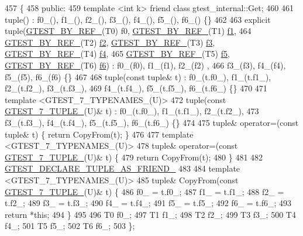 \begin{DoxyCode}
457                         \{
458  \textcolor{keyword}{public}:
459   \textcolor{keyword}{template} <\textcolor{keywordtype}{int} k> \textcolor{keyword}{friend} \textcolor{keyword}{class }gtest\_internal::Get;
460 
461   tuple() : f0\_(), f1\_(), f2\_(), f3\_(), f4\_(), f5\_(), f6\_() \{\}
462 
463   \textcolor{keyword}{explicit} tuple(\hyperlink{gtest-tuple_8h_adcf9057737a411d833fac0382c13a181}{GTEST\_BY\_REF\_}(T0) f0, \hyperlink{gtest-tuple_8h_adcf9057737a411d833fac0382c13a181}{GTEST\_BY\_REF\_}(T1) 
      \hyperlink{namespacestd_1_1tr1_a9c0fa65b105f8e2f58ba59ecf75fd000}{f1},
464       \hyperlink{gtest-tuple_8h_adcf9057737a411d833fac0382c13a181}{GTEST\_BY\_REF\_}(T2) \hyperlink{namespacestd_1_1tr1_a87dd9e009868361317f587126dba63d4}{f2}, \hyperlink{gtest-tuple_8h_adcf9057737a411d833fac0382c13a181}{GTEST\_BY\_REF\_}(T3) \hyperlink{namespacestd_1_1tr1_a0f7c3b47d27d42d82d1a333ea420ce4e}{f3}, 
      \hyperlink{gtest-tuple_8h_adcf9057737a411d833fac0382c13a181}{GTEST\_BY\_REF\_}(T4) \hyperlink{namespacestd_1_1tr1_adc796e02b7385d526aff708189564f67}{f4},
465       \hyperlink{gtest-tuple_8h_adcf9057737a411d833fac0382c13a181}{GTEST\_BY\_REF\_}(T5) \hyperlink{namespacestd_1_1tr1_a9c1eb66b2b2fa321942af95405232a0d}{f5}, \hyperlink{gtest-tuple_8h_adcf9057737a411d833fac0382c13a181}{GTEST\_BY\_REF\_}(T6) \hyperlink{namespacestd_1_1tr1_a6b62f32e1e3e21bceb94eb46c4cbfd56}{f6}) : f0\_(f0), f1\_(f1), f2\_(f2)
      ,
466       f3\_(f3), f4\_(f4), f5\_(f5), f6\_(f6) \{\}
467 
468   tuple(\textcolor{keyword}{const} tuple& t) : f0\_(t.f0\_), f1\_(t.f1\_), f2\_(t.f2\_), f3\_(t.f3\_),
469       f4\_(t.f4\_), f5\_(t.f5\_), f6\_(t.f6\_) \{\}
470 
471   \textcolor{keyword}{template} <GTEST\_7\_TYPENAMES\_(U)>
472   tuple(\textcolor{keyword}{const} \hyperlink{gtest-tuple_8h_a8987baf82ee028d1d778447413a02c0c}{GTEST\_7\_TUPLE\_}(U)& t) : f0\_(t.f0\_), f1\_(t.f1\_), f2\_(t.f2\_),
473       f3\_(t.f3\_), f4\_(t.f4\_), f5\_(t.f5\_), f6\_(t.f6\_) \{\}
474 
475   tuple& operator=(\textcolor{keyword}{const} tuple& t) \{ \textcolor{keywordflow}{return} CopyFrom(t); \}
476 
477   \textcolor{keyword}{template} <GTEST\_7\_TYPENAMES\_(U)>
478   tuple& operator=(\textcolor{keyword}{const} \hyperlink{gtest-tuple_8h_a8987baf82ee028d1d778447413a02c0c}{GTEST\_7\_TUPLE\_}(U)& t) \{
479     \textcolor{keywordflow}{return} CopyFrom(t);
480   \}
481 
482   \hyperlink{gtest-tuple_8h_a2b20671273f514a88a6e9b8328e5f257}{GTEST\_DECLARE\_TUPLE\_AS\_FRIEND\_}
483 
484   \textcolor{keyword}{template} <GTEST\_7\_TYPENAMES\_(U)>
485   tuple& CopyFrom(\textcolor{keyword}{const} \hyperlink{gtest-tuple_8h_a8987baf82ee028d1d778447413a02c0c}{GTEST\_7\_TUPLE\_}(U)& t) \{
486     f0\_ = t.f0\_;
487     f1\_ = t.f1\_;
488     f2\_ = t.f2\_;
489     f3\_ = t.f3\_;
490     f4\_ = t.f4\_;
491     f5\_ = t.f5\_;
492     f6\_ = t.f6\_;
493     \textcolor{keywordflow}{return} *\textcolor{keyword}{this};
494   \}
495 
496   T0 f0\_;
497   T1 f1\_;
498   T2 f2\_;
499   T3 f3\_;
500   T4 f4\_;
501   T5 f5\_;
502   T6 f6\_;
503 \};
\end{DoxyCode}
